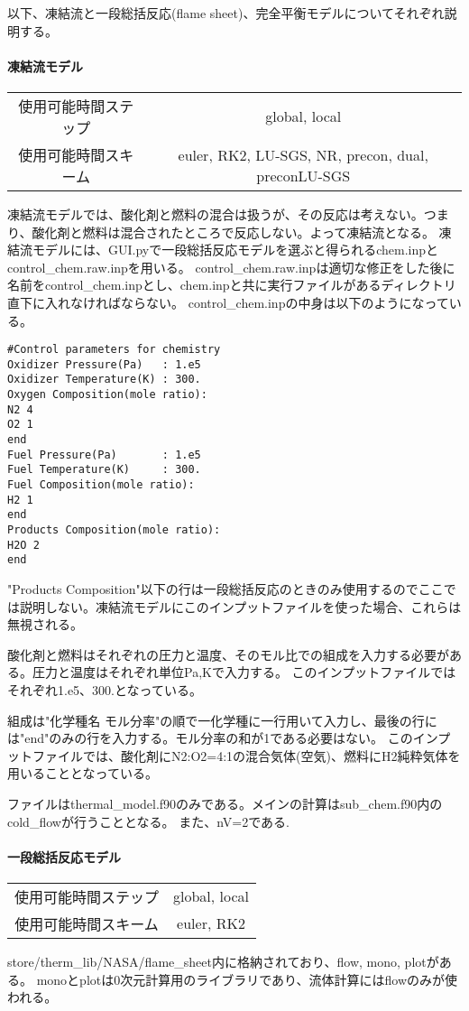 \documentclass{jsarticle}
\begin{document}
\hspace{1em}

以下、凍結流と一段総括反応(flame sheet)、完全平衡モデルについてそれぞれ説明する。

\paragraph{凍結流モデル}%
\begin{center}
\begin{tabular}{c||c}\hline
使用可能時間ステップ & global, local\\
使用可能時間スキーム & euler, RK2, LU-SGS, NR, precon, dual, preconLU-SGS\\
\hline
\end{tabular}
\end{center}
凍結流モデルでは、酸化剤と燃料の混合は扱うが、その反応は考えない。つまり、酸化剤と燃料は混合されたところで反応しない。よって凍結流となる。
凍結流モデルには、GUI.pyで一段総括反応モデルを選ぶと得られるchem.inpとcontrol\_chem.raw.inpを用いる。
control\_chem.raw.inpは適切な修正をした後に名前をcontrol\_chem.inpとし、chem.inpと共に実行ファイルがあるディレクトリ直下に入れなければならない。
control\_chem.inpの中身は以下のようになっている。
\begin{verbatim}
#Control parameters for chemistry
Oxidizer Pressure(Pa)   : 1.e5
Oxidizer Temperature(K) : 300.
Oxygen Composition(mole ratio):
N2 4
O2 1
end
Fuel Pressure(Pa)       : 1.e5
Fuel Temperature(K)     : 300.
Fuel Composition(mole ratio):
H2 1
end
Products Composition(mole ratio):
H2O 2
end
\end{verbatim}
"Products Composition"以下の行は一段総括反応のときのみ使用するのでここでは説明しない。凍結流モデルにこのインプットファイルを使った場合、これらは無視される。

酸化剤と燃料はそれぞれの圧力と温度、そのモル比での組成を入力する必要がある。圧力と温度はそれぞれ単位Pa,Kで入力する。
このインプットファイルではそれぞれ1.e5、300.となっている。

組成は"化学種名 モル分率"の順で一化学種に一行用いて入力し、最後の行には"end"のみの行を入力する。モル分率の和が1である必要はない。
このインプットファイルでは、酸化剤にN2:O2=4:1の混合気体(空気)、燃料にH2純粋気体を用いることとなっている。

ファイルはthermal\_model.f90のみである。メインの計算はsub\_chem.f90内のcold\_flowが行うこととなる。
また、nV=2である.
\paragraph{一段総括反応モデル}%
\begin{center}
\begin{tabular}{c||c}\hline
使用可能時間ステップ & global, local\\
使用可能時間スキーム & euler, RK2\\
\hline
\end{tabular}
\end{center}
store/therm\_lib/NASA/flame\_sheet内に格納されており、flow, mono, plotがある。
monoとplotは0次元計算用のライブラリであり、流体計算にはflowのみが使われる。
\end{document}
